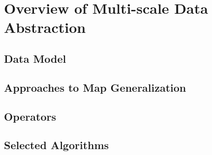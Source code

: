 \chapter{Overview of Multi-scale Data Abstraction}


\section{Data Model}

\section{Approaches to Map Generalization}

\section{Operators}


\section{Selected Algorithms}

